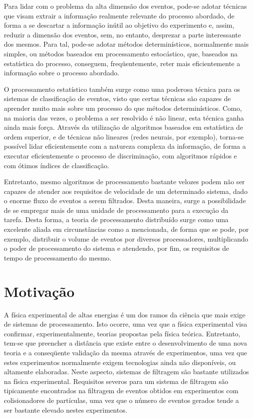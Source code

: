 Para lidar com o problema da alta dimensão dos eventos, pode-se adotar técnicas que visam extrair a informação realmente relevante do processo abordado, de forma a se descartar a informação inútil ao objetivo do experimento e, assim, reduzir a dimensão dos eventos, sem, no entanto, desprezar a parte interessante dos mesmos. Para tal, pode-se adotar métodos determinísticos, normalmente mais simples, ou métodos baseados em processamento estocástico, que, baseados na estatística do processo, conseguem, freqüentemente, reter mais eficientemente a informação sobre o processo abordado.

O processamento estatístico também surge como uma poderosa técnica para os sistemas de classificação de eventos, visto que certas técnicas são capazes de aprender muito mais sobre um processo do que métodos determinísticos. Como, na maioria das vezes, o problema a ser resolvido é não linear, esta técnica ganha ainda mais força. Através da utilização de algoritmos baseados em estatística de ordem superior, e de técnicas não lineares (redes neurais, por exemplo), torna-se possível lidar eficientemente com a natureza complexa da informação, de forma a executar eficientemente o processo de discriminação, com algoritmos rápidos e com ótimos índices de classificação.


Entretanto, mesmo algoritmos de processamento bastante velozes podem não ser capazes de atender aos requisitos de velocidade de um determinado sistema, dado o enorme fluxo de eventos a serem filtrados. Desta maneira, surge a possibilidade de se empregar mais de uma unidade de processamento para a execução da tarefa. Desta forma, a teoria de processamento distribuído surge como uma excelente aliada em circunstâncias como a mencionada, de forma que se pode, por exemplo, distribuir o volume de eventos por diversos processadores, multiplicando o poder de processamento do sistema e atendendo, por fim, os requisitos de tempo de processamento do mesmo. 


\section{Motivação}

A física experimental de altas energias é um dos ramos da ciência que mais exige de sistemas de processamento. Isto ocorre, uma vez que a física experimental visa confirmar, experimentalmente, teorias propostas pela física teórica. Entretanto, tem-se que preencher a distância que existe entre o desenvolvimento de uma nova teoria e a conseqüente validação da mesma através de experimentos, uma vez que estes experimentos normalmente exigem tecnologias ainda não disponíveis, ou altamente elaboradas. Neste aspecto, sistemas de filtragem são bastante utilizados na física experimental. Requisitos severos para um sistema de filtragem são tipicamente encontrados na filtragem de eventos obtidos em experimentos com colisionadores de partículas, uma vez que o número de eventos gerados tende a ser bastante elevado nestes experimentos.

